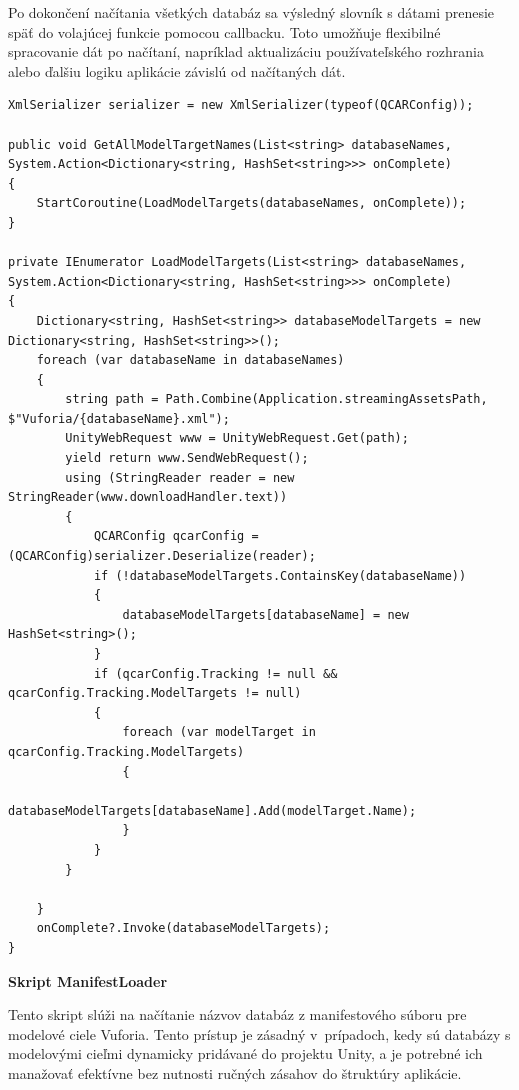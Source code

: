 Po dokončení načítania všetkých databáz sa výsledný slovník s dátami prenesie späť do volajúcej funkcie pomocou callbacku. Toto umožňuje flexibilné spracovanie dát po načítaní, napríklad aktualizáciu používateľského rozhrania alebo ďalšiu logiku aplikácie závislú od načítaných dát.

\lstset{style=Csharp}
\begin{lstlisting}[caption={ModelTargetDatabaseXmlReader Class - Čítanie databázy z xml súboru}, label=modelTargetDatabaseXmlReader]
XmlSerializer serializer = new XmlSerializer(typeof(QCARConfig));

public void GetAllModelTargetNames(List<string> databaseNames, System.Action<Dictionary<string, HashSet<string>>> onComplete)
{
    StartCoroutine(LoadModelTargets(databaseNames, onComplete));
}

private IEnumerator LoadModelTargets(List<string> databaseNames, System.Action<Dictionary<string, HashSet<string>>> onComplete)
{
    Dictionary<string, HashSet<string>> databaseModelTargets = new Dictionary<string, HashSet<string>>();
    foreach (var databaseName in databaseNames)
    {
        string path = Path.Combine(Application.streamingAssetsPath, $"Vuforia/{databaseName}.xml");
        UnityWebRequest www = UnityWebRequest.Get(path);
        yield return www.SendWebRequest();
        using (StringReader reader = new StringReader(www.downloadHandler.text))
        {
            QCARConfig qcarConfig = (QCARConfig)serializer.Deserialize(reader);
            if (!databaseModelTargets.ContainsKey(databaseName))
            {
                databaseModelTargets[databaseName] = new HashSet<string>();
            }
            if (qcarConfig.Tracking != null && qcarConfig.Tracking.ModelTargets != null)
            {
                foreach (var modelTarget in qcarConfig.Tracking.ModelTargets)
                {
                    databaseModelTargets[databaseName].Add(modelTarget.Name);
                }
            }
        }
        
    }
    onComplete?.Invoke(databaseModelTargets);
}
\end{lstlisting} 

{\large\textbf{Skript ManifestLoader}}

Tento skript slúži na načítanie názvov databáz z manifestového súboru pre modelové ciele Vuforia. Tento prístup je zásadný v~prípadoch, kedy sú databázy s modelovými cieľmi dynamicky pridávané do projektu Unity, a je potrebné ich manažovať efektívne bez nutnosti ručných zásahov do štruktúry aplikácie.

